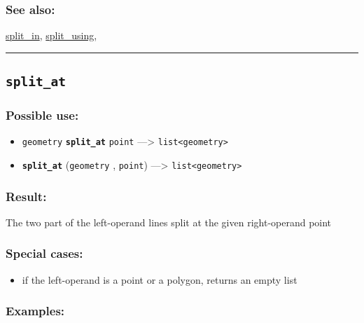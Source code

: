 \documentclass[]{book}
\providecommand{\tightlist}{%
  \setlength{\itemsep}{0pt}\setlength{\parskip}{0pt}}
\theoremstyle{definition}
\theoremstyle{definition}
\theoremstyle{definition}
\theoremstyle{remark}
\begin{document}
\subsubsection{See also:}\label{see-also-192}

\href{OperatorsSZ\#split_in}{split\_in},
\href{OperatorsSZ\#split_using}{split\_using},

\begin{center}\rule{0.5\linewidth}{\linethickness}\end{center}

\subsection{\texorpdfstring{\texttt{split\_at}}{split\_at}}\label{split_at}

\subsubsection{Possible use:}\label{possible-use-492}

\begin{itemize}
\tightlist
\item
  \texttt{geometry} \textbf{\texttt{split\_at}} \texttt{point}
  ---\textgreater{} \texttt{list\textless{}geometry\textgreater{}}
\item
  \textbf{\texttt{split\_at}} (\texttt{geometry} , \texttt{point})
  ---\textgreater{} \texttt{list\textless{}geometry\textgreater{}}
\end{itemize}

\subsubsection{Result:}\label{result-476}

The two part of the left-operand lines split at the given right-operand
point

\subsubsection{Special cases:}\label{special-cases-128}

\begin{itemize}
\tightlist
\item
  if the left-operand is a point or a polygon, returns an empty list
\end{itemize}

\subsubsection{Examples:}\label{examples-343}
\end{document}
